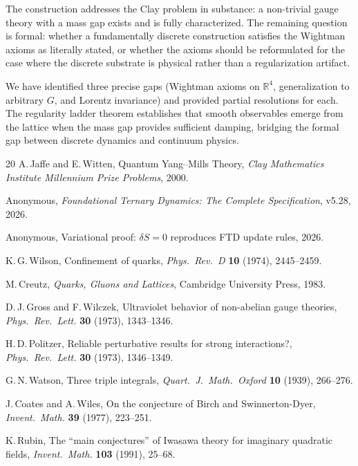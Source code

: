 \documentclass[11pt]{article}
\theoremstyle{tight}
\theoremstyle{plainroman}
\newcommand{\R}{\mathbb{R}}
\begin{document}
The construction addresses the Clay problem in substance: a non-trivial gauge theory with a mass gap exists and is fully characterized.
The remaining question is formal: whether a fundamentally discrete construction satisfies the Wightman axioms as literally stated, or whether the axioms should be reformulated for the case where the discrete substrate is physical rather than a regularization artifact.

We have identified three precise gaps (Wightman axioms on $\R^4$, generalization to arbitrary $G$, and Lorentz invariance) and provided partial resolutions for each.
The regularity ladder theorem establishes that smooth observables emerge from the lattice when the mass gap provides sufficient damping, bridging the formal gap between discrete dynamics and continuum physics.

\begin{thebibliography}{20}
A.\,Jaffe and E.\,Witten,
Quantum Yang--Mills Theory,
\emph{Clay Mathematics Institute Millennium Prize Problems}, 2000.

Anonymous,
\emph{Foundational Ternary Dynamics: The Complete Specification}, v5.28, 2026.

Anonymous,
Variational proof: $\delta S=0$ reproduces FTD update rules, 2026.

K.\,G.\,Wilson,
Confinement of quarks,
\emph{Phys.\ Rev.\ D} \textbf{10} (1974), 2445--2459.

M.\,Creutz,
\emph{Quarks, Gluons and Lattices},
Cambridge University Press, 1983.

D.\,J.\,Gross and F.\,Wilczek,
Ultraviolet behavior of non-abelian gauge theories,
\emph{Phys.\ Rev.\ Lett.} \textbf{30} (1973), 1343--1346.

H.\,D.\,Politzer,
Reliable perturbative results for strong interactions?,
\emph{Phys.\ Rev.\ Lett.} \textbf{30} (1973), 1346--1349.

G.\,N.\,Watson,
Three triple integrals,
\emph{Quart.\ J.\ Math.\ Oxford} \textbf{10} (1939), 266--276.

J.\,Coates and A.\,Wiles,
On the conjecture of Birch and Swinnerton-Dyer,
\emph{Invent.\ Math.} \textbf{39} (1977), 223--251.

K.\,Rubin,
The ``main conjectures'' of Iwasawa theory for imaginary quadratic fields,
\emph{Invent.\ Math.} \textbf{103} (1991), 25--68.
\end{thebibliography}
\end{document}
